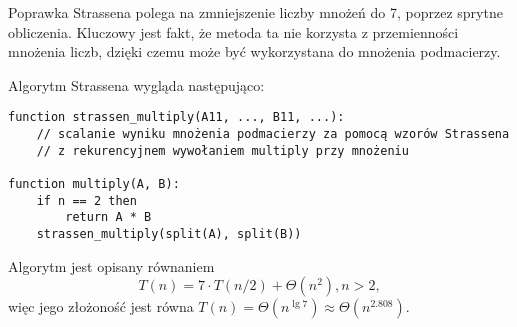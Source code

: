 Poprawka Strassena polega na zmniejszenie liczby mnożeń do 7, poprzez sprytne obliczenia.
Kluczowy jest fakt, że metoda ta nie korzysta z przemienności mnożenia liczb, dzięki czemu może być wykorzystana do mnożenia podmacierzy.

Algorytm Strassena wygląda następująco:
\begin{verbatim}
function strassen_multiply(A11, ..., B11, ...):
    // scalanie wyniku mnożenia podmacierzy za pomocą wzorów Strassena
    // z rekurencyjnem wywołaniem multiply przy mnożeniu

function multiply(A, B):
    if n == 2 then
        return A * B
    strassen_multiply(split(A), split(B))
\end{verbatim}

Algorytm jest opisany równaniem 
\[ T(n) = 7 \cdot T(n/2) + \Theta(n^2), n > 2, \]
więc jego złożoność jest równa \( T(n) = \Theta(n^{\lg 7}) \approx \Theta(n^{2.808}) \).